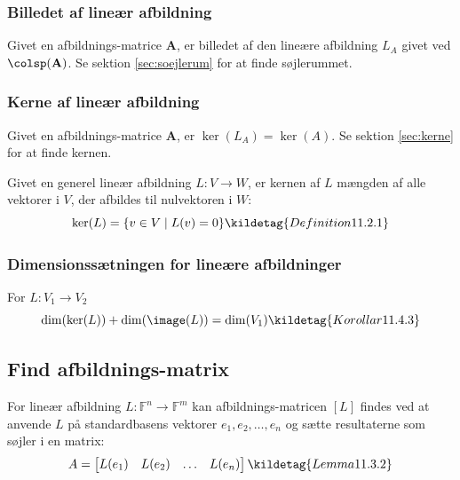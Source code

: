 \subsubsection{Billedet af lineær afbildning}
Givet en afbildnings-matrice \( \mathbf{A} \), er billedet af den lineære afbildning \( L_A \) givet ved  \( \colsp(\mathbf{A}) \).
Se sektion \ref{sec:soejlerum} for at finde søjlerummet.


\subsubsection{Kerne af lineær afbildning}
Givet en afbildnings-matrice \( \mathbf{A} \), er \(\ker(L_A) = \ker(A)\).
Se sektion \ref{sec:kerne} for at finde kernen.


Givet en generel lineær afbildning \( L : V \rightarrow W \), er kernen af \( L \) mængden af alle vektorer i \( V \), der afbildes til nulvektoren i \( W \):
\[
\ker(L) = \{ v \in V \mid L(v) = 0 \}
\kildetag{Definition 11.2.1}
\]

\subsubsection{Dimensionssætningen for lineære afbildninger}
For \(L: V_1 \to V_2\)
\[
\dim(\ker(L)) + \dim(\image(L)) = \dim(V_1)
\kildetag{Korollar 11.4.3}
\]

\subsection{Find afbildnings-matrix}
For lineær afbildning \(L: \mathbb{F}^n \to \mathbb{F}^m\) kan afbildnings-matricen \( [L] \) findes ved at anvende \(L\) på standardbasens vektorer \(e_1, e_2, \ldots, e_n\) og sætte resultaterne som søjler i en matrix:
\[
A = \begin{bmatrix}
    L(e_1) & L(e_2) & \ldots & L(e_n)
\end{bmatrix}
\kildetag{Lemma 11.3.2}
\]

